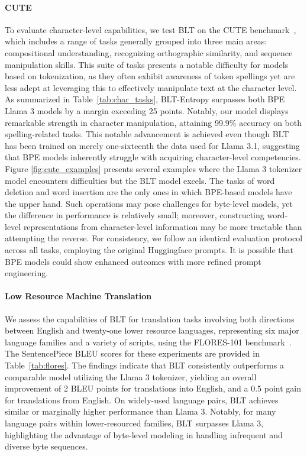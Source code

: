 \paragraph{CUTE}
To evaluate character-level capabilities, we test {\textsc BLT} on the CUTE benchmark~\citep{edman2024cute}, which includes a range of tasks generally grouped into three main areas: compositional understanding, recognizing orthographic similarity, and sequence manipulation skills. This suite of tasks presents a notable difficulty for models based on tokenization, as they often exhibit awareness of token spellings yet are less adept at leveraging this to effectively manipulate text at the character level. As summarized in Table~\ref{tab:char_tasks}, {\textsc BLT}-Entropy surpasses both BPE Llama 3 models by a margin exceeding 25 points. Notably, our model displays remarkable strength in character manipulation, attaining 99.9\% accuracy on both spelling-related tasks. This notable advancement is achieved even though {\textsc BLT} has been trained on merely one-sixteenth the data used for Llama 3.1, suggesting that BPE models inherently struggle with acquiring character-level competencies. Figure \ref{fig:cute_examples} presents several examples where the Llama 3 tokenizer model encounters difficulties but the {\textsc BLT} model excels. The tasks of word deletion and word insertion are the only ones in which BPE-based models have the upper hand. Such operations may pose challenges for byte-level models, yet the difference in performance is relatively small; moreover, constructing word-level representations from character-level information may be more tractable than attempting the reverse. For consistency, we follow an identical evaluation protocol across all tasks, employing the original Huggingface prompts. It is possible that BPE models could show enhanced outcomes with more refined prompt engineering.

\paragraph{Low Resource Machine Translation} We assess the capabilities of {\textsc BLT} for translation tasks involving both directions between English and twenty-one lower resource languages, representing six major language families and a variety of scripts, using the FLORES-101 benchmark~\citep{goyal2022flores}. The SentencePiece BLEU scores for these experiments are provided in Table~\ref{tab:flores}. The findings indicate that {\textsc BLT} consistently outperforms a comparable model utilizing the Llama 3 tokenizer, yielding an overall improvement of 2 BLEU points for translations into English, and a 0.5 point gain for translations from English. On widely-used language pairs, {\textsc BLT} achieves similar or marginally higher performance than Llama 3. Notably, for many language pairs within lower-resourced families, {\textsc BLT} surpasses Llama 3, highlighting the advantage of byte-level modeling in handling infrequent and diverse byte sequences.

